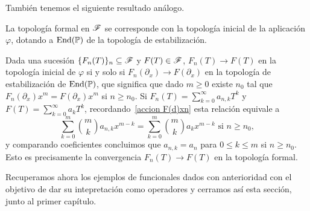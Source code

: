 También tenemos el siguiente resultado análogo.

\begin{proposicion}
    La topología formal en $\mathscr{F}$ se corresponde con la topología inicial de la aplicación $\varphi$, dotando a $\operatorname*{End}(\mathbb{P})$ de la topología de estabilización.
\end{proposicion}



\begin{demo}
Dada una sucesión $\{F_{n}(T)\}_{n} \subseteq \mathscr{F}$ y $F(T) \in \mathscr{F}$, $F_{n}(T) \to F(T)$ en la topología inicial de $\varphi$ si y solo si $F_{n}(\partial_{x}) \to F(\partial_{x})$ en la topología de estabilización de $\operatorname*{End}(\mathbb{P})$, que significa que dado $m \geq 0$ existe $n_{0}$ tal que $F_{n}(\partial_{x}) x^{m} = F(\partial_{x}) x^{m}$ si $n \geq n_{0}$. Si $F_{n}(T) = \sum_{k=0}^{\infty} a_{n,k} T^{k}$ y $F(T) = \sum_{k=0}^{\infty} a_{k} T^{k}$, recordando~\eqref{accion F(d)xn} esta relación equivale a
\[
	\sum_{k=0}^{m} \binom{m}{k} a_{n,k} x^{m-k} = \sum_{k=0}^{m} \binom{m}{k} a_{k} x^{m-k} \text{ si } n \geq n_{0},
\]
y comparando coeficientes concluimos que $a_{n,k} = a_{n}$ para $0 \leq k \leq m$ si $n \geq n_{0}$. Esto es precisamente la convergencia $F_{n}(T) \to F(T)$ en la topología formal.
\end{demo}



















Recuperamos ahora los ejemplos de funcionales dados con anterioridad con el objetivo de dar su intepretación como operadores y cerramos así esta sección, junto al primer capítulo.

